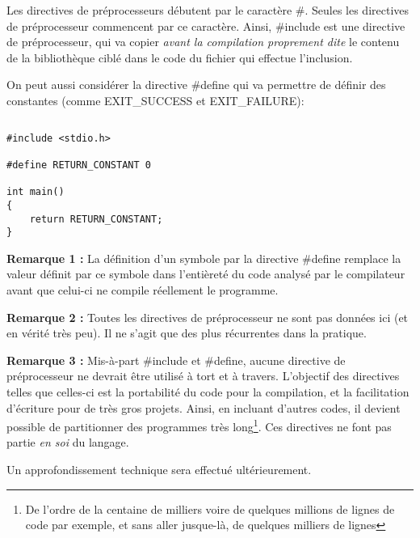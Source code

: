 \documentclass[../../../main.tex]{subfiles}
\begin{document}
Les directives de préprocesseurs débutent par le caractère \#. Seules les directives de préprocesseur commencent par ce caractère. Ainsi, \textsf{\#include} est une directive de préprocesseur, qui va copier \textit{avant la compilation proprement dite} le contenu de la bibliothèque ciblé dans le code du fichier qui effectue l'inclusion.
 
On peut aussi considérer la directive \textsf{\#define} qui va permettre de définir des constantes (comme \textsf{EXIT\_SUCCESS} et \textsf{EXIT\_FAILURE}):
\begin{lstlisting}[title=Exemple]
\end{lstlisting}
\begin{verbatim}
#include <stdio.h>

#define RETURN_CONSTANT 0

int main()
{
	return RETURN_CONSTANT;
}
\end{verbatim}
\textbf{Remarque 1 :} La définition d'un symbole par la directive \textsf{\#define} remplace la valeur définit par ce symbole dans l'entièreté du code analysé par le compilateur avant que celui-ci ne compile réellement le programme.
 
\textbf{Remarque 2 :} Toutes les directives de préprocesseur ne sont pas données ici (et en vérité très peu). Il ne s'agit que des plus récurrentes dans la pratique.
 
\textbf{Remarque 3 :} Mis-à-part \textsf{\#include} et \textsf{\#define}, aucune directive de préprocesseur ne devrait être utilisé à tort et à travers. L'objectif des directives telles que celles-ci est la portabilité du code pour la compilation, et la facilitation d'écriture pour de très gros projets. Ainsi, en incluant d'autres codes, il devient possible de partitionner des programmes très long\footnote{De l'ordre de la centaine de milliers voire de	quelques millions de lignes de code par exemple, et sans aller jusque-là, de quelques milliers de lignes}. Ces directives ne font pas partie \textit{en soi} du langage.
 
Un approfondissement technique sera effectué ultérieurement.
\end{document}
